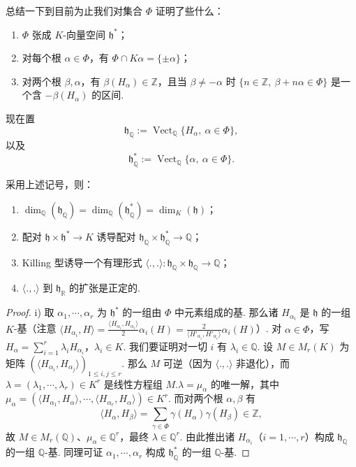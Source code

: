 \begin{numpara}\label{np:ssl-3-1-6}
总结一下到目前为止我们对集合 $\Phi$ 证明了些什么：
\begin{enumerate}[label=\roman*)]
\item $\Phi$ 张成 $K$-向量空间 $\mathfrak h^*$；
\item 对每个根 $\alpha\in\Phi$，有 $\Phi\cap K\alpha=\{\pm\alpha\}$；
\item 对两个根 $\beta,\alpha$，有 $\beta(H_\alpha)\in\mathbb Z$，且当 $\beta\neq-\alpha$ 时 $\{n\in\mathbb Z,\ \beta+n\alpha\in\Phi\}$ 是一个含 $-\beta(H_\alpha)$ 的区间.
\end{enumerate}
现在置
\[
\mathfrak h_{\mathbb Q}:=\operatorname{Vect}_{\mathbb Q}\{H_\alpha,\ \alpha\in\Phi\},
\]
以及
\[
\mathfrak h^{*}_{\mathbb Q}:=\operatorname{Vect}_{\mathbb Q}\{\alpha,\ \alpha\in\Phi\}.
\]
\begin{proposition*}
采用上述记号，则：
\begin{enumerate}[label=\roman*)]
\item $\dim_{\mathbb Q}(\mathfrak h_{\mathbb Q})=\dim_{\mathbb Q}(\mathfrak h^{*}_{\mathbb Q})=\dim_K(\mathfrak h)$；
\item 配对 $\mathfrak h\times\mathfrak h^{*}\longrightarrow K$ 诱导配对 $\mathfrak h_{\mathbb Q}\times\mathfrak h^{*}_{\mathbb Q}\longrightarrow\mathbb Q$；
\item Killing 型诱导一个有理形式 $\langle.,.\rangle\colon\mathfrak h_{\mathbb Q}\times\mathfrak h_{\mathbb Q}\longrightarrow\mathbb Q$；
\item $\langle.,.\rangle$ 到 $\mathfrak h_{\mathbb R}$ 的扩张是正定的.
\end{enumerate}
\end{proposition*}
\begin{proof}
i) 取 $\alpha_1,\cdots,\alpha_r$ 为 $\mathfrak h^{*}$ 的一组由 $\Phi$ 中元素组成的基. 那么诸 $H_{\alpha_i}$ 是 $\mathfrak h$ 的一组 $K$-基（注意 $\langle H_{\alpha_i},H\rangle=\frac{\langle H_{\alpha_i},H_{\alpha_i}\rangle}{2}\alpha_i(H)=\frac{2}{\langle H'_{\alpha_i},H'_{\alpha_i}\rangle}\alpha_i(H)$）. 对 $\alpha\in\Phi$，写 $H_\alpha=\sum_{i=1}^r\lambda_iH_{\alpha_i}$，$\lambda_i\in K$. 我们要证明对一切 $i$ 有 $\lambda_i\in\mathbb Q$. 设 $M\in M_r(K)$ 为矩阵 $(\langle H_{\alpha_i},H_{\alpha_j}\rangle)_{1\leqslant i,j\leqslant r}$. 那么 $M$ 可逆（因为 $\langle.,.\rangle$ 非退化），而 $\lambda=(\lambda_1,\cdots,\lambda_r)\in K^r$ 是线性方程组 $M.\lambda=\mu_\alpha$ 的唯一解，其中 $\mu_\alpha=(\langle H_{\alpha_1},H_\alpha\rangle,\cdots,\langle H_{\alpha_r},H_\alpha\rangle)\in K^r$. 而对两个根 $\alpha,\beta$ 有
\[\langle H_\alpha,H_\beta\rangle=\sum_{\gamma\in\Phi}\gamma(H_\alpha)\gamma(H_\beta)\in\mathbb Z,\]
故 $M\in M_r(\mathbb Q)$、$\mu_\alpha\in\mathbb Q^r$，最终 $\lambda\in\mathbb Q^r$. 由此推出诸 $H_{\alpha_i}$（$i=1,\cdots,r$）构成 $\mathfrak h_{\mathbb Q}$ 的一组 $\mathbb Q$-基. 同理可证 $\alpha_1,\cdots,\alpha_r$ 构成 $\mathfrak h^{*}_{\mathbb Q}$ 的一组 $\mathbb Q$-基.


\end{proof}
\end{numpara}
